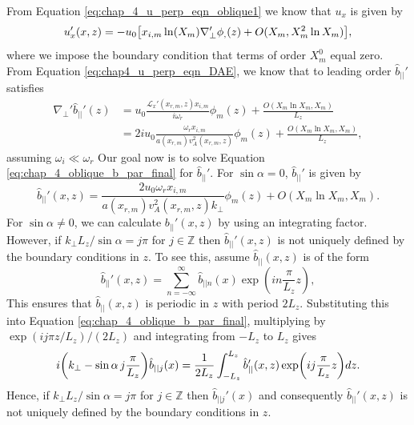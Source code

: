 From Equation \eqref{eq:chap_4_u_perp_eqn_oblique1} we know that $u_x$ is given by
\begin{equation}
    \label{eq:chap_4_oblique_ux_final}
    u_x'(x,z) = -u_0\qty[x_{i,m}\ln(X_m)\nabla_\perp'\phi_,(z) + O(X_m,X_m^2\ln X_m)],
\end{equation}
where we impose the boundary condition that terms of order $X_m^0$ equal zero.
From Equation \eqref{eq:chap4_u_perp_eqn_DAE}, we know that to leading order $\hat{b}_{||}'$ satisfies
\begin{equation}
    \label{eq:chap_4_oblique_b_par_final}
    \begin{aligned}
   \nabla_\perp' \hat{b}_{||}'(z) &= u_0\frac{\mathcal{L}_x'(x_{r,m},z)x_{i,m}}{i\omega_r}\phi_m(z) + \frac{O(X_m\ln X_m, X_m)}{L_z} \\
   &= 2iu_0\frac{\omega_r x_{i,m}}{a(x_{r,m})v_A^2(x_{r,m},z)}\phi_m(z) + \frac{O(X_m\ln X_m, X_m)}{L_z},
   \end{aligned}
\end{equation}
assuming $\omega_i\ll\omega_r$
Our goal now is to solve Equation \eqref{eq:chap_4_oblique_b_par_final} for $\hat{b}_{||}'$. For $\sin\alpha=0$, $\hat{b}_{||}'$ is given by
\begin{equation}
    \hat{b}_{||}'(x,z) = \frac{2u_0\omega_r x_{i,m}}{a(x_{r,m})v_A^2(x_{r,m},z)k_\perp}\phi_m(z) + O(X_m\ln X_m, X_m).
\end{equation}
For $\sin\alpha\ne0$, we can calculate $b_{||}'(x,z)$ by using an integrating factor. However, if $k_\perp L_z/\sin\alpha = j\pi$ for $j\in\mathds{Z}$ then $\hat{b}_{||}'(x,z)$ is not uniquely defined by the boundary conditions in $z$. To see this, assume $\hat{b}_{||}(x,z)$ is of the form
\[\hat{b}_{||}'(x,z) = \sum_{n=-\infty}^\infty \hat{b}_{||n}(x)\exp(in\frac{\pi}{L_z}z),\]
This ensures that $\hat{b}_{||}(x,z)$ is periodic in $z$ with period $2L_z$. Substituting this into Equation \eqref{eq:chap_4_oblique_b_par_final}, multiplying by 
$\exp(ij\pi z/L_z)/(2 L_z)$ and integrating from $-L_z$ to $L_z$ gives
\[i\qty(k_\perp - \sin\alpha\, j\frac{\pi}{L_z})\hat{b}_{|| j}(x) = \frac{1}{2L_z}\int_{-L_z}^{L_z}\hat{b}_{||}'(x,z)\exp(ij\frac{\pi}{L_z}z)dz.\]
Hence, if $k_\perp L_z/\sin\alpha = j\pi$ for $j\in\mathds{Z}$ then $\hat{b}_{||j}'(x)$ and consequently $\hat{b}_{||}'(x,z)$ is not uniquely defined by the boundary conditions in $z$. 

